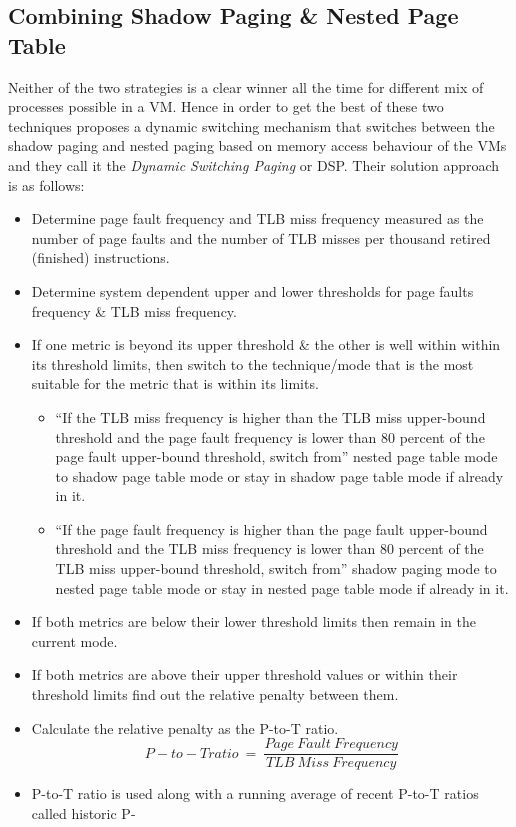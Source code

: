 \subsection{Combining Shadow Paging \& Nested Page Table}
Neither of the two strategies is a clear winner all the time for different mix of processes
possible in a VM. Hence in order to get the best of these two techniques \citet{wang2011selective}
proposes a dynamic switching mechanism that switches between the shadow paging and nested paging
based on memory access behaviour of the VMs and they call it the \textit{Dynamic Switching Paging}
or DSP. Their solution approach is as follows:
\begin{itemize}
\item Determine page fault frequency and TLB miss frequency measured as the number of page faults
and the number of TLB misses per thousand retired (finished) instructions.
\item Determine system dependent upper and lower thresholds for page faults frequency \& TLB miss
frequency.
\item If one metric is beyond its upper threshold \& the other is well within within its threshold
limits, then switch to the technique/mode that is the most suitable for the metric that is within
its limits.
\begin{itemize}
\item ``If the TLB miss frequency is higher than the TLB miss upper-bound threshold and the page
fault frequency is lower than 80 percent of the page fault upper-bound threshold, switch from''
nested page table mode to shadow page table mode or stay in shadow page table mode if already in
it.
\item ``If the page fault frequency is higher than the page fault upper-bound threshold and the
TLB miss frequency is lower than 80 percent of the TLB miss upper-bound threshold, switch from''
shadow paging mode to nested page table mode or stay in nested page table mode if already in it.  
\end{itemize}
\item If both metrics are below their lower threshold limits then remain in the current mode. 
\item If both metrics are above their upper threshold values or within their threshold limits find
out the relative penalty between them.
\item Calculate the relative penalty as the P-to-T ratio. \[P-to-T ratio\ =\ \frac{Page\ Fault\ 
Frequency}{TLB\ Miss\ Frequency}\]
\item P-to-T ratio is used along with a running average of recent P-to-T ratios called historic P-

\end{itemize}
